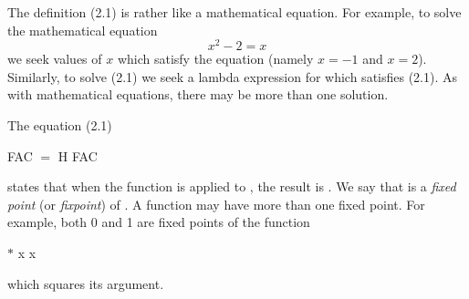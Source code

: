 The definition (2.1) is rather like a mathematical equation. For example, to solve the mathematical equation
\begin{equation*}
    x^{2} - 2 = x
\end{equation*}
we seek values of $x$ which satisfy the equation (namely $x = -1$ and $x = 2$). Similarly, to solve (2.1) we seek a lambda expression for  which satisfies (2.1). As with mathematical equations, there may be more than one solution.

The equation (2.1)
\begin{mlcoded}
    FAC $=$ H FAC
\end{mlcoded}
states that when the function  is applied to , the result is . We say that  is a \textit{fixed point} (or \textit{fixpoint}) of . A function may have more than one fixed point. For example, both 0 and 1 are fixed points of the function
\begin{mlcoded}
    $*$ x x
\end{mlcoded}
which squares its argument.

